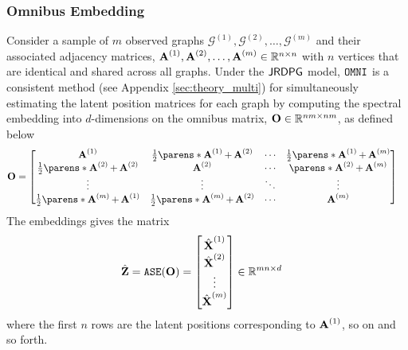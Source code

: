 \subsubsection{Omnibus Embedding}\label{sec:omni}
Consider a sample of $m$ observed graphs $\mathcal{G}^{(1)}, \mathcal{G}^{(2)}, \ldots, \mathcal{G}^{(m)}$  and their associated adjacency matrices, $\operatorname{\mathbf{A}}^{(1)}, \operatorname{\mathbf{A}}^{(2)}, \ldots, \operatorname{\mathbf{A}}^{(m)}\in\mathbb{R}^{n\times n}$ with $n$ vertices that are identical and shared across all graphs. Under the $\operatorname{\mathsf{JRDPG}}$ model, $\operatorname{\mathtt{OMNI}}$ is a consistent method (see Appendix \ref{sec:theory_multi}) for simultaneously estimating the latent position matrices for each graph by computing the spectral embedding into $d$-dimensions on the omnibus matrix, $\mathbf{O}\in\mathbb{R}^{nm\times nm}$, as defined below
\begin{align*}
\mathbf{O} &= 
\begin{bmatrix}
\A^{(1)} & \frac{1}{2}\parens*{\A^{(1)}+\A^{(2)}} & \cdots & \frac{1}{2}\parens*{\A^{(1)}+\A^{(m)}}\\
\frac{1}{2}\parens*{\A^{(2)}+\A^{(2)}} & \A^{(2)} & \cdots & \parens*{\A^{(2)}+\A^{(m)}}\\
\vdots & \vdots & \ddots & \vdots\\
\frac{1}{2}\parens*{\A^{(m)}+\A^{(1)}} & \frac{1}{2}\parens*{\A^{(m)}+\A^{(2)}} & \cdots & \A^{(m)}
\end{bmatrix}
\end{align*}
The embeddings gives the matrix
\begin{align*}
    \hat{\mathbf{Z}} &= \operatorname{\mathtt{ASE}}(\mathbf{O}) = 
    \begin{bmatrix}
    \hat{\operatorname{\mathbf{X}}}^{(1)}\\
    \hat{\operatorname{\mathbf{X}}}^{(2)}\\
    \vdots\\
    \hat{\operatorname{\mathbf{X}}}^{(m)}
    \end{bmatrix}\in\mathbb{R}^{mn\times d}
\end{align*}
where the first $n$ rows are the latent positions corresponding to $\operatorname{\mathbf{A}}^{(1)}$, so on and so forth. 

